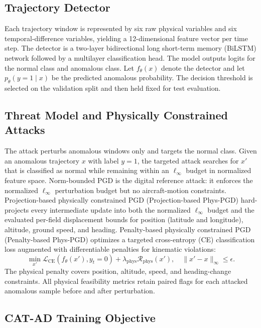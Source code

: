 \documentclass[runningheads]{llncs}
\begin{document}
\subsection{Trajectory Detector}
\label{subsec:detector}

Each trajectory window is represented by six raw physical variables and six temporal-difference variables, yielding a 12-dimensional feature vector per time step.
The detector is a two-layer bidirectional long short-term memory (BiLSTM) network followed by a multilayer classification head.
The model outputs logits for the normal class and anomalous class.
Let $f_\theta(x)$ denote the detector and let $p_\theta(y=1\mid x)$ be the predicted anomalous probability.
The decision threshold is selected on the validation split and then held fixed for test evaluation.

\subsection{Threat Model and Physically Constrained Attacks}
\label{subsec:threat_model}

The attack perturbs anomalous windows only and targets the normal class.
Given an anomalous trajectory $x$ with label $y=1$, the targeted attack searches for $x'$ that is classified as normal while remaining within an $\ell_\infty$ budget in normalized feature space.
Norm-bounded PGD is the digital reference attack: it enforces the normalized $\ell_\infty$ perturbation budget but no aircraft-motion constraints.
Projection-based physically constrained PGD (Projection-based Phys-PGD) hard-projects every intermediate update into both the normalized $\ell_\infty$ budget and the evaluated per-field displacement bounds for position (latitude and longitude), altitude, ground speed, and heading.
Penalty-based physically constrained PGD (Penalty-based Phys-PGD) optimizes a targeted cross-entropy (CE) classification loss augmented with differentiable penalties for kinematic violations:
\begin{equation}
  \min_{x'} \mathcal{L}_{\mathrm{CE}}(f_\theta(x'), y_t=0)
  + \lambda_{\mathrm{phys}}\mathcal{R}_{\mathrm{phys}}(x'),
  \quad \|x'-x\|_\infty \le \epsilon .
\end{equation}
The physical penalty covers position, altitude, speed, and heading-change constraints.
All physical feasibility metrics retain paired flags for each attacked anomalous sample before and after perturbation.

\subsection{CAT-AD Training Objective}
\label{subsec:catad}
\end{document}
